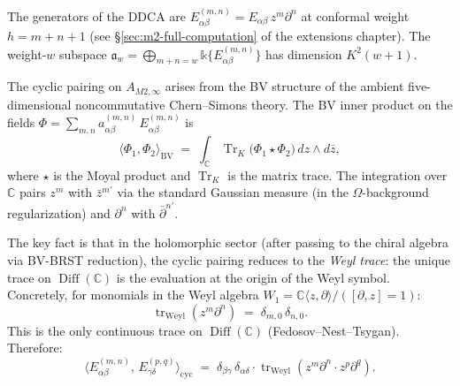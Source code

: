 \documentclass[11pt]{article}
\newcommand{\C}{\mathbb{C}}
\newcommand{\Tr}{\operatorname{Tr}}
\newcommand{\tr}{\operatorname{tr}}
\providecommand{\Diff}{\operatorname{Diff}}
\begin{document}
The generators of the DDCA are
$E^{(m,n)}_{\alpha\beta} = E_{\alpha\beta}\, z^m \partial^n$
at conformal weight $h = m + n + 1$ (see
\S\ref{sec:m2-full-computation} of the extensions chapter).  The
weight-$w$ subspace
$\mathfrak{a}_w = \bigoplus_{m+n=w}
\mathbb{k}\{E^{(m,n)}_{\alpha\beta}\}$
has dimension $K^2(w+1)$.

The cyclic pairing on $A_{M2,\infty}$ arises from the BV
structure of the ambient five-dimensional noncommutative
Chern--Simons theory.  The BV inner product on the fields
$\Phi = \sum_{m,n} a^{(m,n)}_{\alpha\beta}\,
E^{(m,n)}_{\alpha\beta}$ is
\begin{equation}\label{eq:m2-bv-pairing}
\langle \Phi_1, \Phi_2 \rangle_{\mathrm{BV}}
\;=\;
\int_{\C} \Tr_K\!\bigl(\Phi_1 \star \Phi_2\bigr)\, dz \wedge d\bar{z},
\end{equation}
where $\star$ is the Moyal product and $\Tr_K$ is the matrix
trace.  The integration over $\C$ pairs $z^m$ with $\bar{z}^{m'}$
via the standard Gaussian measure (in the $\Omega$-background
regularization) and $\partial^n$ with $\bar{\partial}^{n'}$.

The key fact is that in the holomorphic sector (after passing to
the chiral algebra via BV-BRST reduction), the cyclic pairing
reduces to the \emph{Weyl trace}: the unique trace on $\Diff(\C)$
is the evaluation at the origin of the Weyl symbol.  Concretely,
for monomials in the Weyl algebra $W_1 = \C\langle z, \partial
\rangle / ([\partial, z] = 1)$:
\begin{equation}\label{eq:weyl-trace}
\tr_{\mathrm{Weyl}}(z^m \partial^n)
\;=\;
\delta_{m,0}\,\delta_{n,0}.
\end{equation}
This is the only continuous trace on $\Diff(\C)$
(Fedosov--Nest--Tsygan).  Therefore:
\begin{equation}\label{eq:m2-cyclic-pairing}
\langle E^{(m,n)}_{\alpha\beta},\,
E^{(p,q)}_{\gamma\delta} \rangle_{\mathrm{cyc}}
\;=\;
\delta_{\beta\gamma}\,\delta_{\alpha\delta}\cdot
\tr_{\mathrm{Weyl}}(z^m \partial^n \cdot z^p \partial^q).
\end{equation}
\end{document}
